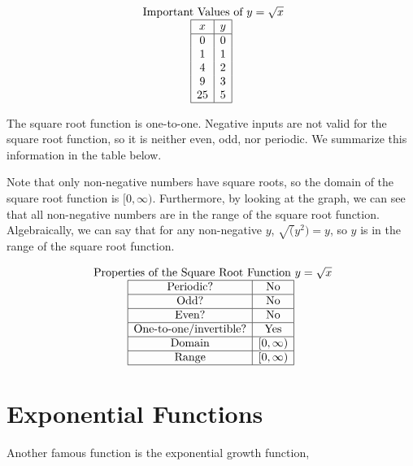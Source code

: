 \documentclass[nooutcomes]{ximera}
\begin{document}
 
\[
\begin{array}{c }
 \text{ Important Values of $y=\sqrt{x}$} \\
\begin{array}{|c|c|}
 \hline
 x & y\\
 \hline
 0&0\\
 1&1\\
 4&2\\
 9&3\\
 25&5\\
 \hline
\end{array}
\end{array}
\]
 
The square root function is one-to-one. Negative inputs are not valid for the square root function, so it is neither even, odd, nor periodic. We summarize this information in the table below.
 
Note that only non-negative numbers have square roots, so the domain of the square root function is $[0, \infty)$. Furthermore, by looking at the graph, we can see that all non-negative numbers are in the range of the square root function. Algebraically, we can say that for any non-negative $y$, $\sqrt(y^2) = y$, so $y$ is in the range of the square root function.
 
\[
\begin{array}{c }
 \text{ Properties of the Square Root Function } y=\sqrt{x} \\
\begin{array}{|c|c|}
 \hline
\text{Periodic?} & \text{No} \\ \hline
\text{Odd?} & \text{No} \\ \hline
\text{Even?} & \text{No} \\ \hline
\text{One-to-one/invertible?} & \text{Yes}\\ \hline
\text{Domain} & [0,\infty)\\ \hline
\text{Range} & [0,\infty)\\ \hline
\end{array}
\end{array}
\]
 
\newpage
 
 
\section{Exponential Functions}
Another famous function is the exponential growth function,
 
\end{document}
